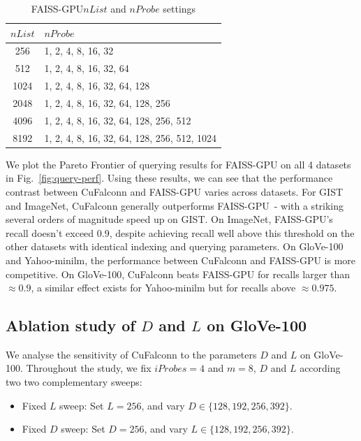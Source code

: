 \documentclass{article}
\newcommand{\cf}{CuFalconn\xspace}
\newcommand{\fgpu}{FAISS-GPU\xspace}
\newcommand{\glv}{GloVe-100\xspace}
\newcommand{\ymlm}{Yahoo-minilm\xspace}
\begin{document}
\begin{table}[h]
    \centering
    \begin{tabular}{c | l}
    $nList$ & $nProbe$ \\
    \hline
    256  & 1, 2, 4, 8, 16, 32 \\
    512  & 1, 2, 4, 8, 16, 32, 64 \\
    1024 & 1, 2, 4, 8, 16, 32, 64, 128 \\
    2048 & 1, 2, 4, 8, 16, 32, 64, 128, 256 \\
    4096 & 1, 2, 4, 8, 16, 32, 64, 128, 256, 512 \\
    8192 & 1, 2, 4, 8, 16, 32, 64, 128, 256, 512, 1024 \\
    \end{tabular}
    \caption{\fgpu $nList$ and $nProbe$ settings}
    \label{tab:faiss-params}
\end{table}

We plot the Pareto Frontier of querying results for \fgpu on all 4 datasets in Fig.~\ref{fig:query-perf}. Using these results, we can see that the performance contrast between \cf and \fgpu varies across datasets. For GIST and ImageNet, \cf generally outperforms \fgpu~- with a striking several orders of magnitude speed up on GIST. On ImageNet, \fgpu's recall doesn't exceed $0.9$, despite achieving recall well above this threshold on the other datasets with identical indexing and querying parameters. On \glv and \ymlm, the performance between \cf and \fgpu is more competitive. On \glv, \cf beats \fgpu for recalls larger than $\approx 0.9$, a similar effect exists for \ymlm but for recalls above $\approx 0.975$.

\subsection{Ablation study of $D$ and $L$ on \glv}
\label{sec:DL-ablation}

We analyse the sensitivity of \cf to the parameters $D$ and $L$ on \glv. Throughout the study, we fix $iProbes = 4$ and $m = 8$, $D$ and $L$ according two two complementary sweeps:

\begin{itemize}
    \item Fixed $L$ sweep: Set $L = 256$, and vary $D \in \{128, 192, 256, 392\}$.
    \item Fixed $D$ sweep:
Set $D = 256$, and vary $L \in \{128, 192, 256, 392\}$.
\end{itemize}
\end{document}
